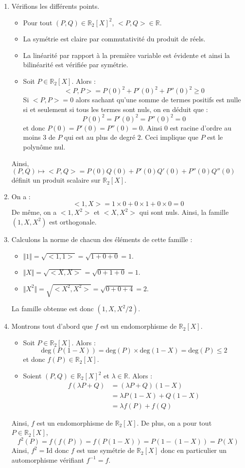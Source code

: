 \documentclass[a4paper,twoside,french,11pt]{VcCours}
\begin{document}
\begin{corr} 
\begin{enumerate}
\item Vérifions les différents points.
\begin{itemize}
\item Pour tout $(P,Q) \in \mathbb{R}_2[X]^2$, $<P,Q> \in \mathbb{R}$.
\item La symétrie est claire par commutativité du produit de réels.
\item La linéarité par rapport à la première variable est évidente et ainsi la bilinéarité est vérifiée par symétrie.
\item Soit $P \in \mathbb{R}_2[X]$. Alors :
$$ <P,P> = P(0)^2 + P'(0)^2 + P''(0)^2 \geq 0$$
Si $<P,P>=0$ alors sachant qu'une somme de termes positifs est nulle si et seulement si tous les termes sont nuls, on en déduit que :
$$ P(0)^2 = P'(0)^2= P''(0)^2 = 0$$
et donc $P(0)=P'(0)=P''(0)=0$. Ainsi $0$ est racine d'ordre au moins $3$ de $P$ qui est au plus de degré $2$. Ceci implique que $P$ est le polynôme nul.
\end{itemize}
Ainsi, $(P,Q) \mapsto <P,Q> = P(0)Q(0)+ P'(0)Q'(0)+P''(0)Q''(0)$ définit un produit scalaire sur $\mathbb{R}_2[X]$.
\item On a :
$$ <1,X> = 1 \times 0 + 0 \times 1 + 0 \times 0 = 0$$
De même, on a $<1,X^2>$ et $<X,X^2>$ qui sont nuls. Ainsi, la famille $(1,X,X^2)$ est orthogonale.
\item Calculons la norme de chacun des éléments de cette famille :
\begin{itemize}
\item $\Vert 1 \Vert = \sqrt{<1,1>} = \sqrt{1+0+0}= 1$.
\item $\Vert X \Vert = \sqrt{<X,X>} = \sqrt{0+1+0} = 1$.
\item $\Vert X^2 \Vert = \sqrt{<X^2,X^2>} = \sqrt{0+0+4} = 2$.
\end{itemize}
La famille obtenue est donc $(1,X,X^2/2)$.
\item Montrons tout d'abord que $f$ est un endomorphisme de $\mathbb{R}_2[X]$.
\begin{itemize}
\item Soit $P \in \mathbb{R}_2[X]$. Alors :
$$ \textrm{deg}(P(1-X))= \textrm{deg}(P) \times \textrm{deg}(1-X) = \textrm{deg}(P) \leq 2$$
et donc $f(P) \in \mathbb{R}_2[X]$.
\item Soient $(P,Q) \in \mathbb{R}_2[X]^2$ et $\lambda \in \mathbb{R}$. Alors :
\begin{align*}
f(\lambda P +Q) & = (\lambda P + Q)(1-X) \\
& = \lambda P(1-X) + Q(1-X) \\
& = \lambda f(P)+ f(Q) 
\end{align*}
\end{itemize}
Ainsi, $f$ est un endomorphisme de $\mathbb{R}_2[X]$. De plus, on a pour tout $P \in \mathbb{R}_2[X]$,
$$ f^2(P) = f(f(P))=f(P(1-X))= P(1-(1-X))=P(X)$$
Ainsi, $f^2= \textrm{Id}$ donc $f$ est une symétrie de $\mathbb{R}_2[X]$ donc en particulier un automorphisme vérifiant $f^{-1}=f$.



\end{enumerate}
\end{corr}
\end{document}
